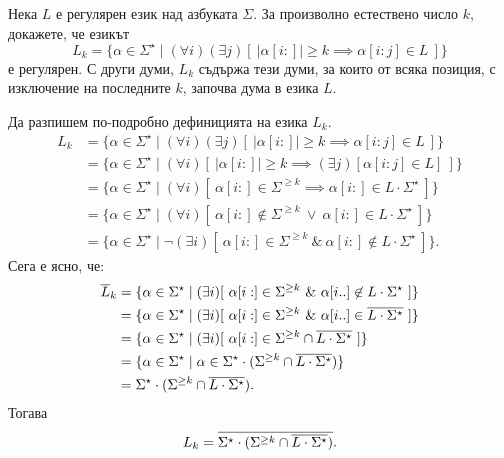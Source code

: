 \begin{extra}
\begin{problem}
  Нека $L$ е регулярен език над азбуката $\Sigma$.
  За произволно естествено число $k$, докажете, че езикът
  \[L_k = \{ \alpha \in \Sigma^\star \mid (\forall i)(\exists j)[\ |\alpha[i:]| \geq k \implies \alpha[i:j] \in L\ ]\}\]
  е регулярен.
  С други думи, $L_k$ съдържа тези думи, за които от всяка позиция, с изключение на последните $k$, започва дума в езика $L$.
\end{problem}
\begin{hint}
  Да разпишем по-подробно дефиницията на езика $L_k$.
  \begin{align*}
    L_k & = \{ \alpha \in \Sigma^\star \mid (\forall i)(\exists j)[\ |\alpha[i:]| \geq k \implies \alpha[i:j] \in L\ ]\}\\
        & = \{ \alpha \in \Sigma^\star \mid (\forall i)[\ |\alpha[i:]| \geq k \implies (\exists j)[\alpha[i:j] \in L]\ ]\}\\
        & = \{ \alpha \in \Sigma^\star \mid (\forall i)[\ \alpha[i:] \in \Sigma^{\geq k} \implies \alpha[i:] \in L \cdot \Sigma^\star\ ]\}\\
        & = \{ \alpha \in \Sigma^\star \mid (\forall i)[\ \alpha[i:] \not\in \Sigma^{\geq k}\ \lor\ \alpha[i:] \in L \cdot \Sigma^\star\ ]\}\\
        & = \{ \alpha \in \Sigma^\star \mid \neg (\exists i)[\ \alpha[i:] \in \Sigma^{\geq k}\ \&\ \alpha[i:] \not\in L \cdot \Sigma^\star\ ]\}.
  \end{align*}
  Сега е ясно, че:
  \begin{align*}
    \ov{L}_k & = \{ \alpha \in \Sigma^\star \mid (\exists i)[\ \alpha[i:] \in \Sigma^{\geq k}\ \&\ \alpha[i..] \not\in L \cdot \Sigma^\star\ ]\}\\
             & = \{ \alpha \in \Sigma^\star \mid (\exists i)[\ \alpha[i:] \in \Sigma^{\geq k}\ \&\ \alpha[i..] \in \ov{L \cdot \Sigma^\star}\ ]\}\\
             & = \{ \alpha \in \Sigma^\star \mid (\exists i)[\ \alpha[i:] \in \Sigma^{\geq k} \cap \ov{L \cdot \Sigma^\star}\ ]\}\\
             & = \{ \alpha \in \Sigma^\star \mid \alpha \in \Sigma^\star \cdot (\Sigma^{\geq k} \cap \ov{L \cdot \Sigma^\star}) \}\\
             & = \Sigma^\star \cdot (\Sigma^{\geq k} \cap \ov{L \cdot \Sigma^\star}).
  \end{align*}
  Тогава
  \[L_k = \overline{\Sigma^\star \cdot (\Sigma^{\geq k} \cap \overline{L \cdot \Sigma^\star})}.\]
\end{hint}

\end{extra}


